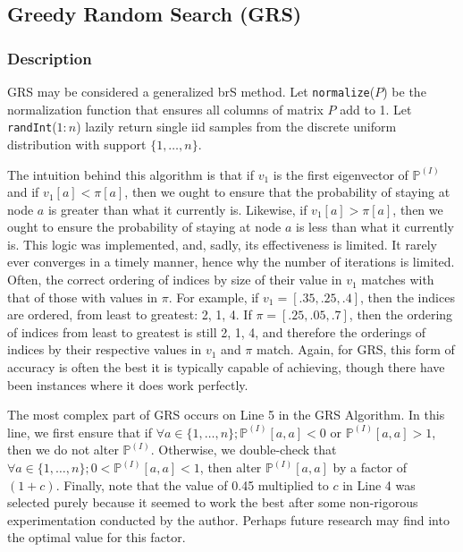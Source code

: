 \documentclass{article}
\begin{document}
\subsection{Greedy Random Search (GRS)}
\subsubsection{Description}
GRS may be considered a generalized brS method. Let \texttt{normalize}($P$) be the normalization function that ensures all columns of matrix $P$ add to 1. Let \texttt{randInt}($1:n$) lazily return single iid samples from the discrete uniform distribution with support $\{1, \dots, n\}$.

The intuition behind this algorithm is that if $v_1$ is the first eigenvector of $\mathbb{P}^{(I)}$ and if $v_1[a] < \pi[a]$, then we ought to ensure that the probability of staying at node $a$ is greater than what it currently is. Likewise, if $v_1[a] > \pi[a]$, then we ought to ensure the probability of staying at node $a$ is less than what it currently is. This logic was implemented, and, sadly, its effectiveness is limited. It rarely ever converges in a timely manner, hence why the number of iterations is limited. Often, the correct ordering of indices by size of their value in $v_1$ matches with that of those with values in $\pi$. For example, if $v_1 = [.35,.25,.4]$, then the indices are ordered, from least to greatest: 2, 1, 4. If $\pi = [.25,.05,.7]$, then the ordering of indices from least to greatest is still 2, 1, 4, and therefore the orderings of indices by their respective values in $v_1$ and $\pi$ match. Again, for GRS, this form of accuracy is often the best it is typically capable of achieving, though there have been instances where it does work perfectly.

The most complex part of GRS occurs on Line 5 in the GRS Algorithm. In this line, we first ensure that if $\forall a \in \{1, \dots, n\}; \mathbb{P}^{(I)}[a,a] < 0$ or $\mathbb{P}^{(I)}[a,a] > 1$, then we do not alter $\mathbb{P}^{(I)}$. Otherwise, we double-check that $\forall a \in \{1, \dots, n\}; 0 < \mathbb{P}^{(I)}[a,a] < 1$, then alter $\mathbb{P}^{(I)}[a,a]$ by a factor of $(1+c)$. Finally, note that the value of 0.45 multiplied to $c$ in Line 4 was selected purely because it seemed to work the best after some non-rigorous experimentation conducted by the author. Perhaps future research may find into the optimal value for this factor.

\end{document}
